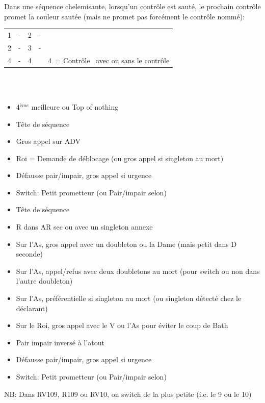 \documentclass[a4paper, oneside, 11pt]{report}
\begin{document}
	Dans une séquence chelemisante,  lorsqu'un contrôle est sauté,  le prochain contrôle promet la couleur sautée (mais ne promet pas forcément le contrôle nommé):\\
	\begin{tabular}{cccc|l}
	1\pique & -  & 2\trefle & - &\\
	2\pique & - & 3\pique & - &\\
	4\carreau & - & 4\coeur && 4\coeur\ = Contrôle \trefle\ avec ou sans le contrôle \coeur\\
	\end{tabular}\\\\

		\begin{itemize}
		\item 4$^{ème}$ meilleure ou Top of nothing
		\item Tête de séquence
		\item Gros appel sur ADV
		\item Roi = Demande de déblocage (ou gros appel si singleton au mort)
		\item Défausse pair/impair,  gros appel si urgence
		\item Switch: Petit prometteur (ou Pair/impair selon)\\
		\end{itemize}

		\begin{itemize}
		\item Tête de séquence
		\item R dans AR sec ou avec un singleton annexe
		\item Sur l'As,  gros appel avec un doubleton ou la Dame (mais petit dans D seconde)
		\item Sur l'As,  appel/refus avec deux doubletons au mort (pour switch ou non dans l'autre doubleton)
		\item Sur l'As,  préférentielle si singleton au mort (ou singleton détecté chez le déclarant)
		\item Sur le Roi,  gros appel avec le V ou l'As pour éviter le coup de Bath
		\item Pair impair inversé à l'atout
		\item Défausse pair/impair,  gros appel si urgence
		\item Switch: Petit prometteur (ou Pair/impair selon)\\
		\end{itemize}
		NB: Dans RV109, R109 ou RV10,  on switch de la plus petite (i.e.  le 9 ou le 10)
\end{document}
